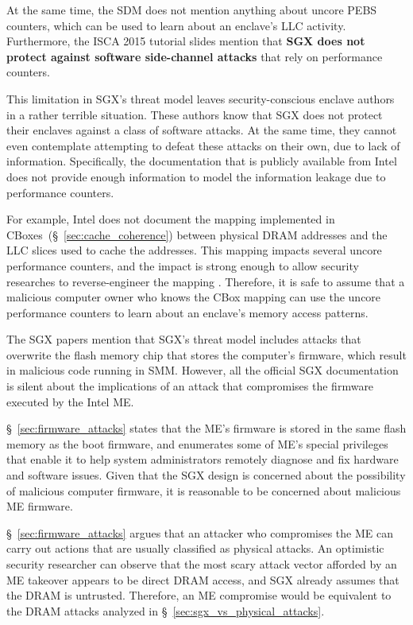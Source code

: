 
At the same time, the SDM does not mention anything about uncore PEBS counters,
which can be used to learn about an enclave's LLC activity. Furthermore, the
ISCA 2015 tutorial slides mention that \textbf{SGX does not protect against
software side-channel attacks} that rely on performance counters.

This limitation in SGX's threat model leaves security-conscious enclave authors
in a rather terrible situation. These authors know that SGX does not protect
their enclaves against a class of software attacks. At the same time, they
cannot even contemplate attempting to defeat these attacks on their own, due to
lack of information. Specifically, the documentation that is publicly available
from Intel does not provide enough information to model the information leakage
due to performance counters.

For example, Intel does not document the mapping implemented in
CBoxes~(\S~\ref{sec:cache_coherence}) between physical DRAM addresses and the
LLC slices used to cache the addresses. This mapping impacts several uncore
performance counters, and the impact is strong enough to allow security
researches to reverse-engineer the mapping \cite{inci2015rsachannel,
maurice2015intelhash, yarom2015intelhash}. Therefore, it is safe to assume that
a malicious computer owner who knows the CBox mapping can use the uncore
performance counters to learn about an enclave's memory access patterns.

The SGX papers mention that SGX's threat model includes attacks that overwrite
the flash memory chip that stores the computer's firmware, which result in
malicious code running in SMM.  However, all the official SGX documentation is
silent about the implications of an attack that compromises the firmware
executed by the Intel ME.

\S~\ref{sec:firmware_attacks} states that the ME's firmware is stored in the
same flash memory as the boot firmware, and enumerates some of ME's special
privileges that enable it to help system administrators remotely diagnose and
fix hardware and software issues. Given that the SGX design is concerned about
the possibility of malicious computer firmware, it is reasonable to be
concerned about malicious ME firmware.

\S~\ref{sec:firmware_attacks} argues that an attacker who compromises the ME
can carry out actions that are usually classified as physical attacks.
An optimistic security researcher can observe that the most scary attack vector
afforded by an ME takeover appears to be direct DRAM access, and SGX already
assumes that the DRAM is untrusted. Therefore, an ME compromise would be
equivalent to the DRAM attacks analyzed in
\S~\ref{sec:sgx_vs_physical_attacks}.

